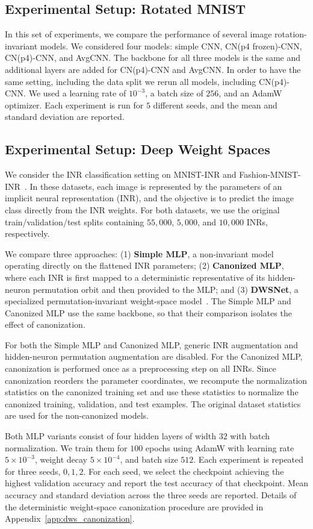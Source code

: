 \documentclass{article}
\begin{document}
\subsection{Experimental Setup: Rotated MNIST}
In this set of experiments, we compare the performance of several image rotation-invariant models. We considered four models: simple CNN, CN(p4 frozen)-CNN, CN(p4)-CNN, and AvgCNN. The backbone for all three models is the same and additional layers are added for CN(p4)-CNN and AvgCNN. 
In order to have the same setting, including the data split we rerun all models, including CN(p4)-CNN.
We used a learning rate of $10^{-3}$, a batch size of $256$, and an AdamW optimizer. Each experiment is run for $5$ different seeds, and the mean and standard deviation are reported. 
\subsection{Experimental Setup: Deep Weight Spaces}
\label{app:dws_setup}

We consider the INR classification setting on MNIST-INR and Fashion-MNIST-INR~\citep{pmlr-v202-navon23a}. In these datasets, each image is represented by the parameters of an implicit neural representation (INR), and the objective is to predict the image class directly from the INR weights. For both datasets, we use the original train/validation/test splits containing $55{,}000$, $5{,}000$, and $10{,}000$ INRs, respectively.

We compare three approaches: (1) \textbf{Simple MLP}, a non-invariant model operating directly on the flattened INR parameters; (2) \textbf{Canonized MLP}, where each INR is first mapped to a deterministic representative of its hidden-neuron permutation orbit and then provided to the MLP; and (3) \textbf{DWSNet}, a specialized permutation-invariant weight-space model~\citep{pmlr-v202-navon23a}. The Simple MLP and Canonized MLP use the same backbone, so that their comparison isolates the effect of canonization.

For both the Simple MLP and Canonized MLP, generic INR augmentation and hidden-neuron permutation augmentation are disabled. For the Canonized MLP, canonization is performed once as a preprocessing step on all INRs. Since canonization reorders the parameter coordinates, we recompute the normalization statistics on the canonized training set and use these statistics to normalize the canonized training, validation, and test examples. The original dataset statistics are used for the non-canonized models.

Both MLP variants consist of four hidden layers of width $32$ with batch normalization. We train them for $100$ epochs using AdamW with learning rate $5\times10^{-3}$, weight decay $5\times10^{-4}$, and batch size $512$. Each experiment is repeated for three seeds, $0,1,2$. For each seed, we select the checkpoint achieving the highest validation accuracy and report the test accuracy of that checkpoint. Mean accuracy and standard deviation across the three seeds are reported. Details of the deterministic weight-space canonization procedure are provided in Appendix~\ref{app:dws_canonization}.
\end{document}
